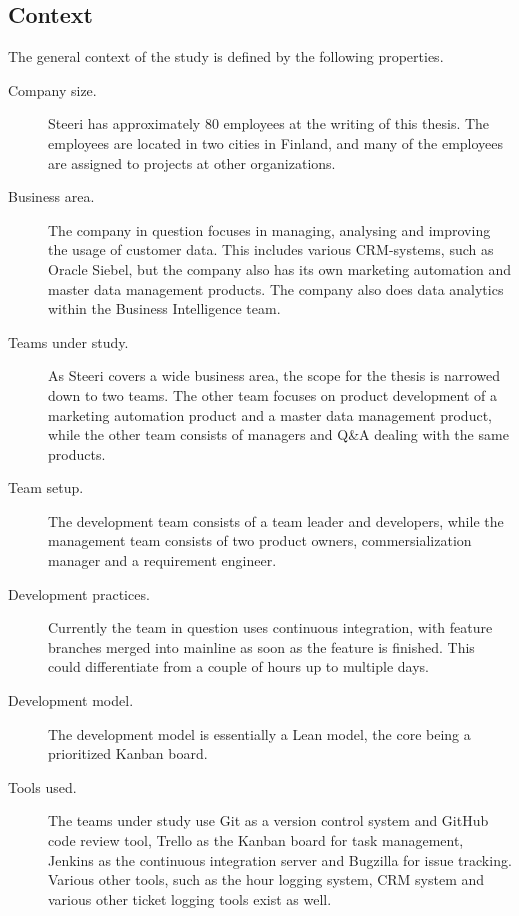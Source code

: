 \documentclass[english]{tktltiki2}
\theoremstyle{definition}
\theoremstyle{remark}
\begin{document}
\subsection{Context} %

The general context of the study is defined by the following properties.

\begin{description}
  \item[Company size.] Steeri has approximately 80 employees at the writing of this thesis. The employees are located in two cities in Finland, and many of the employees are assigned to projects at other organizations.
  \item[Business area.] The company in question focuses in managing, analysing and improving the usage of customer data. This includes various CRM-systems, such as Oracle Siebel, but the company also has its own marketing automation and master data management products. The company also does data analytics within the Business Intelligence team.
  \item[Teams under study.] As Steeri covers a wide business area, the scope for the thesis is narrowed down to two teams. The other team focuses on product development of a marketing automation product and a master data management product, while the other team consists of managers and Q\&A dealing with the same products.
  \item[Team setup.] The development team consists of a team leader and developers, while the management team consists of two product owners, commersialization manager and a requirement engineer. 
  \item[Development practices.] Currently the team in question uses continuous integration, with feature branches merged into mainline as soon as the feature is finished. This could differentiate from a couple of hours up to multiple days.
  \item[Development model.] The development model is essentially a Lean model, the core being a prioritized Kanban board.  
  \item[Tools used.] The teams under study use Git as a version control system and GitHub code review tool, Trello as the Kanban board for task management, Jenkins as the continuous integration server and Bugzilla for issue tracking. Various other tools, such as the hour logging system, CRM system and various other ticket logging tools exist as well.  
\end{description}
\end{document}
